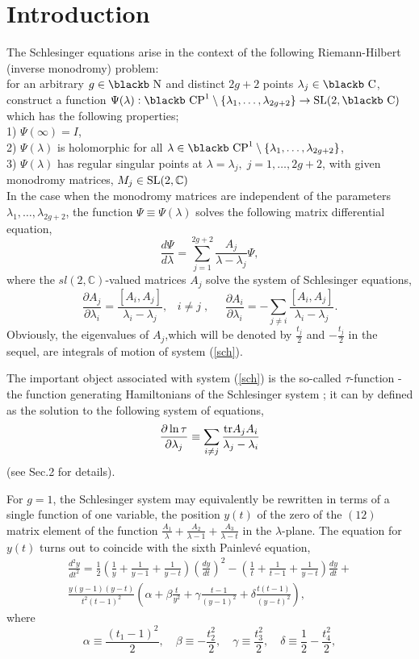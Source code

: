\documentclass[11pt]{article}
\def\Bbb#1{\hbox{\blackb #1}}
\def\be{\begin{equation}}
\def\ee{\end{equation}}
\def\ben{\begin{displaymath}}
\def\een{\end{displaymath}}
\def\l{\lambda}
\def\C{\mathbb{C}}
\def\la{\label}
\def\f{\frac}
\def\log{\ln}
\begin{document}
\section{Introduction}
\setcounter{equation}{0}
The Schlesinger equations \cite{S} arise in the context of the 
following Riemann-Hilbert (inverse monodromy)
problem:\\
for an arbitrary $g\in\Bbb N$ and distinct $2g+2$ points
$\lambda_j\in\Bbb C$, construct a function $\Psi(\lambda):
\Bbb{CP}^1\setminus\{\lambda_1,\dots,\lambda_{2g+2}\}\to {\rm SL}(2,\Bbb C)$
which has the following properties;\\
1) $\Psi(\infty)=I$,\\
2) $\Psi(\lambda)$ is holomorphic for all
$\lambda\in\Bbb{CP}^1\setminus\{\lambda_1,\dots,\lambda_{2g+2}\}$,\\
3) $\Psi(\lambda)$ has regular
singular points  at $\lambda=\lambda_j,\;j=1,\dots,2g+2$, with given
monodromy matrices, $M_j\in{\rm SL}(2,\C)$ \\
In the case when the monodromy matrices are independent of the parameters $\lambda_1,\dots,\lambda_{2g+2}$, the function $\Psi\equiv\Psi(\lambda)$ 
solves the following matrix differential equation,
\be
\frac{d\Psi}{d\lambda}=\sum\limits_{j=1}^{2g+2}
\frac{A_j}{\lambda-\lambda_j}\Psi,
\la{PsiAA}\ee
where the $sl(2,\C)$-valued matrices $A_j$ solve 
the system of Schlesinger equations,
\be
\frac{\partial A_j}{\partial\lambda_i}=
\frac{[A_i,A_j]}{\lambda_i-\lambda_j},\;\;\;i\neq j\;,\;\;\;\;\;
\frac{\partial A_i}{\partial\lambda_i}=
-\sum_{j\neq i}
\frac{[A_i,A_j]}{\lambda_i-\lambda_j}.
\label{sch} 
\ee
Obviously, the eigenvalues of $A_j$,which will be denoted by $\f{t_j}{2}$ and
$-\f{t_j}{2}$ in the sequel, are integrals of motion of system (\ref{sch}).

The important object associated with system (\ref{sch}) is the so-called
$\tau$-function - the function generating  Hamiltonians of the
Schlesinger  system \cite{SMJ,JMU,JM}; it can by defined as the solution to the following system of equations, 
\ben
\f{\partial\log\tau}{\partial\l_j}\equiv\sum_{i\neq j}\frac{{\rm tr}
A_jA_i}{\lambda_j-\lambda_i}
\een
(see Sec.2 for details).
 
For $g=1$, the Schlesinger system may equivalently be rewritten
in terms of a single function of one variable, the position $y(t)$ of the zero 
of the $(12)$ matrix element
of the function $\f{A_1}{\l}+\f{A_2}{\l-1}+\f{A_3}{\l-t}$
in the $\l$-plane. The equation for $y(t)$ turns out to coincide with 
the sixth Painlev\'e equation,
\begin{eqnarray}
  \label{eq:P6}
  &\frac{d^2y}{dt^2}=\frac 12\left(\frac 1y+\frac 1{y-1}+\frac 1{y-t}\right)
\left(\frac{dy}{dt}\right)^2-\left(\frac 1t+\frac 1{t-1}+\frac 1{y-t}\right)
\frac{dy}{dt}+&\nonumber\\
&\frac{y(y-1)(y-t)}{t^2(t-1)^2}\left(\alpha+\beta\frac t{y^2}+
\gamma\frac{t-1}{(y-1)^2}+\delta\frac{t(t-1)}{(y-t)^2}\right),&
\end{eqnarray}
where
\begin{equation}
  \label{DEF_T_J}
\alpha\equiv\frac{(t_1-1)^2}2,\quad\beta\equiv-\frac{t_2^2}2,\quad
\gamma\equiv\frac{t_3^2}2,\quad\delta\equiv\frac 12-\frac {t_4^2}2,
\end{equation}
\end{document}
